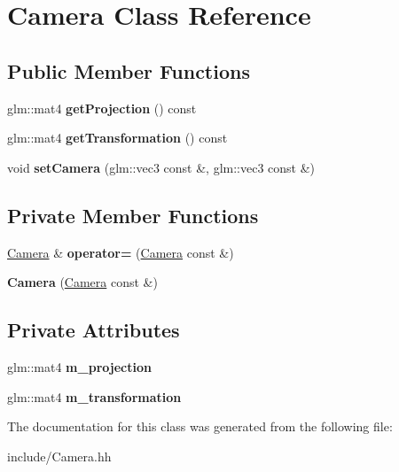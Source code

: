 \hypertarget{class_camera}{}\section{Camera Class Reference}
\label{class_camera}
\subsection*{Public Member Functions}
\begin{DoxyCompactItemize}
\item 
\hypertarget{class_camera_aa3bc85ea7125f9051a45cb522dee71ff}{}glm\+::mat4 {\bfseries get\+Projection} () const \label{class_camera_aa3bc85ea7125f9051a45cb522dee71ff}

\item 
\hypertarget{class_camera_a2fd9af5d248d955f28d200cabb1f8f9c}{}glm\+::mat4 {\bfseries get\+Transformation} () const \label{class_camera_a2fd9af5d248d955f28d200cabb1f8f9c}

\item 
\hypertarget{class_camera_a53cf334ddfce6dcacf6af3e143c009d1}{}void {\bfseries set\+Camera} (glm\+::vec3 const \&, glm\+::vec3 const \&)\label{class_camera_a53cf334ddfce6dcacf6af3e143c009d1}

\end{DoxyCompactItemize}
\subsection*{Private Member Functions}
\begin{DoxyCompactItemize}
\item 
\hypertarget{class_camera_a78240e4db1f45f99e1701d949cc1735b}{}\hyperlink{class_camera}{Camera} \& {\bfseries operator=} (\hyperlink{class_camera}{Camera} const \&)\label{class_camera_a78240e4db1f45f99e1701d949cc1735b}

\item 
\hypertarget{class_camera_aeaf53251c7347ec18640382fa3531cf9}{}{\bfseries Camera} (\hyperlink{class_camera}{Camera} const \&)\label{class_camera_aeaf53251c7347ec18640382fa3531cf9}

\end{DoxyCompactItemize}
\subsection*{Private Attributes}
\begin{DoxyCompactItemize}
\item 
\hypertarget{class_camera_a32746f033de65f9bf0d3e6823b77f339}{}glm\+::mat4 {\bfseries m\+\_\+projection}\label{class_camera_a32746f033de65f9bf0d3e6823b77f339}

\item 
\hypertarget{class_camera_a4961b601647f8565f445a83a865ce076}{}glm\+::mat4 {\bfseries m\+\_\+transformation}\label{class_camera_a4961b601647f8565f445a83a865ce076}

\end{DoxyCompactItemize}


The documentation for this class was generated from the following file\+:\begin{DoxyCompactItemize}
\item 
include/Camera.\+hh\end{DoxyCompactItemize}
